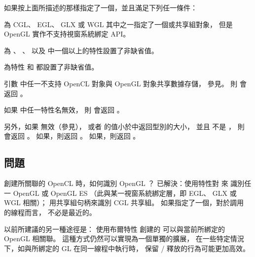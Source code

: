 如果按上面所描述的那樣指定了一個，並且滿足下列任一條件：
\startigBase[indentnext=no]
\item 為 CGL、 EGL、 GLX 或 WGL 其中之一指定了一個或共享組對象，
但是 OpenGL 實作不支持視窗系統綁定 API。

\item 為 、 、
  以及  中一個以上的特性設置了非缺省值。

\item 為特性  和  都設置了非缺省值。

\item 引數  中任一不支持 OpenCL 對象與 OpenGL 對象共享數據存儲，
參見。
\stopigBase
則  會返回 。

如果  中任一特性名無效，
則  會返回 。

另外，如果  無效（參見），
或者  的值小於中返回型別的大小，
並且  不是 ，
則  會返回 。
如果\schostfailres，則返回 。
如果\scdevfailres，則返回 。

\stopreplacepar

\subsection{問題}

\startQUESTION
創建所關聯的 OpenCL 時，如何識別 OpenGL ？
\stopQUESTION
\startANSWER
已解決：使用特性對  來
識別任一 OpenGL 或 OpenGL ES 
（此與某一視窗系統綁定層，即 EGL、 GLX 或 WGL 相關）；
用共享組句柄來識別 CGL 共享組。
如果指定了一個，對於調用  的線程而言，
不必是最近的。

以前所建議的另一種途徑是：
使用布爾特性  創建的
可以與當前所綁定的 OpenGL 相關聯。
這種方式仍然可以實現為一個單獨的擴展，
在一些特定情況下，如與所綁定的 GL 在同一線程中執行時，
保留 / 釋放的行為可能更加高效。
\stopANSWER


